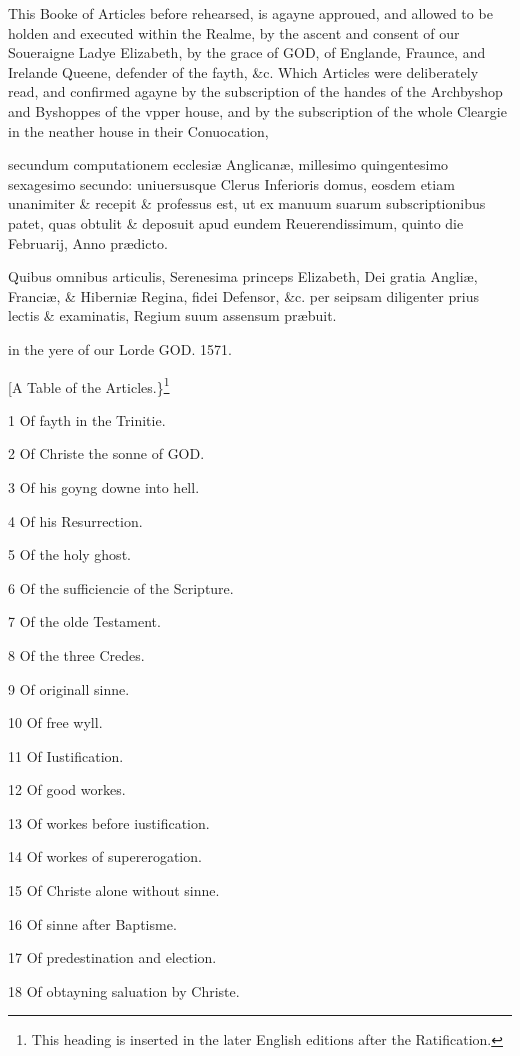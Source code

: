 This Booke of Articles before rehearsed, is agayne approued, and allowed to be holden and executed within the Realme, by the ascent and consent of our Soueraigne Ladye Elizabeth, by the grace of GOD, of Englande, Fraunce, and Irelande Queene, defender of the fayth, \&c. Which Articles were deliberately read, and confirmed agayne by the subscription of the handes of the Archbyshop and Byshoppes of the vpper house, and by the subscription of the whole Cleargie in the neather house in their Conuocation,

secundum computationem ecclesiæ Anglicanæ, millesimo quingentesimo sexagesimo secundo: uniuersusque Clerus Inferioris domus, eosdem etiam unanimiter \& recepit \& professus est, ut ex manuum suarum subscriptionibus patet, quas obtulit \& deposuit apud eundem Reuerendissimum, quinto die Februarij, Anno prædicto.

Quibus omnibus articulis, Serenesima princeps Elizabeth, Dei gratia Angliæ, Franciæ, \& Hiberniæ Regina, fidei Defensor, \&c. per seipsam diligenter prius lectis \& examinatis, Regium suum assensum præbuit.

in the yere of our Lorde GOD. 1571.

[A Table of the Articles.\}\footnote{This heading is inserted in the later English editions after the Ratification.}

1 Of fayth in the Trinitie.

2 Of Christe the sonne of GOD.

3 Of his goyng downe into hell.

4 Of his Resurrection.

5 Of the holy ghost.

6 Of the sufficiencie of the Scripture.

7 Of the olde Testament.

8 Of the three Credes.

9 Of originall sinne.

10 Of free wyll.

11 Of Iustification.

12 Of good workes.

13 Of workes before iustification.

14 Of workes of supererogation.

15 Of Christe alone without sinne.

16 Of sinne after Baptisme.

17 Of predestination and election.

18 Of obtayning saluation by Christe.

